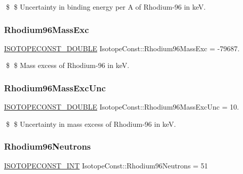 \$ \$ Uncertainty in binding energy per A of Rhodium-\/96 in keV. \mbox{\label{group___isotope_const-_rhodium-_rh96_ga87648dd43dbec36e338a7681c08425f8}} 
\subsubsection{\texorpdfstring{Rhodium96\+Mass\+Exc}{Rhodium96MassExc}}
{\footnotesize\ttfamily \mbox{\hyperlink{group___isotope_const-_macros_ga8f45a7272ce02c0b4c65c44636ed719a}{I\+S\+O\+T\+O\+P\+E\+C\+O\+N\+S\+T\+\_\+\+D\+O\+U\+B\+LE}} Isotope\+Const\+::\+Rhodium96\+Mass\+Exc = -\/79687.}

\$ \$ Mass excess of Rhodium-\/96 in keV. \mbox{\label{group___isotope_const-_rhodium-_rh96_ga1e5a27ed2d192fab28e31ebf2d97af26}} 
\subsubsection{\texorpdfstring{Rhodium96\+Mass\+Exc\+Unc}{Rhodium96MassExcUnc}}
{\footnotesize\ttfamily \mbox{\hyperlink{group___isotope_const-_macros_ga8f45a7272ce02c0b4c65c44636ed719a}{I\+S\+O\+T\+O\+P\+E\+C\+O\+N\+S\+T\+\_\+\+D\+O\+U\+B\+LE}} Isotope\+Const\+::\+Rhodium96\+Mass\+Exc\+Unc = 10.}

\$ \$ Uncertainty in mass excess of Rhodium-\/96 in keV. \mbox{\label{group___isotope_const-_rhodium-_rh96_ga797aac072bc11c6dcc0227ef9e15c801}} 
\subsubsection{\texorpdfstring{Rhodium96\+Neutrons}{Rhodium96Neutrons}}
{\footnotesize\ttfamily \mbox{\hyperlink{group___isotope_const-_macros_ga5f18360b3e99483a35c32d789e62621c}{I\+S\+O\+T\+O\+P\+E\+C\+O\+N\+S\+T\+\_\+\+I\+NT}} Isotope\+Const\+::\+Rhodium96\+Neutrons = 51}

